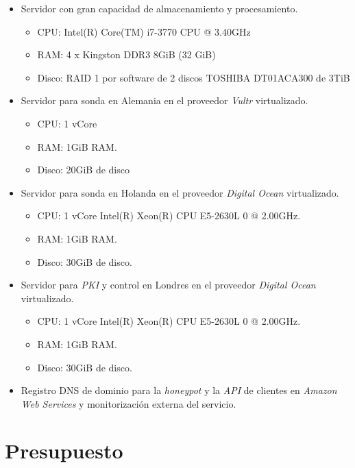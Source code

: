 \begin{itemize}
    \item Servidor con gran capacidad de almacenamiento y procesamiento.
    \begin{itemize}
        \item CPU: Intel(R) Core(TM) i7-3770 CPU @ 3.40GHz
        \item RAM: 4 x Kingston DDR3 8GiB (32 GiB)
        \item Disco: RAID 1 por software de 2 discos TOSHIBA DT01ACA300 de 3TiB
    \end{itemize}

    \item Servidor para sonda en Alemania en el proveedor \emph{Vultr} virtualizado.
    \begin{itemize}
        \item CPU: 1 vCore
        \item RAM: 1GiB RAM.
        \item Disco: 20GiB de disco
    \end{itemize}

    \item Servidor para sonda en Holanda en el proveedor \emph{Digital Ocean} virtualizado.
    \begin{itemize}
        \item CPU: 1 vCore Intel(R) Xeon(R) CPU E5-2630L 0 @ 2.00GHz.
        \item RAM: 1GiB RAM.
        \item Disco: 30GiB de disco.
    \end{itemize}

    \item Servidor para \emph{PKI} y control en Londres en el proveedor \emph{Digital Ocean} virtualizado.
    \begin{itemize}
        \item CPU: 1 vCore Intel(R) Xeon(R) CPU E5-2630L 0 @ 2.00GHz.
        \item RAM: 1GiB RAM.
        \item Disco: 30GiB de disco.
    \end{itemize}

    \item Registro DNS de dominio para la \emph{honeypot} y la \emph{API} de clientes en \emph{Amazon Web Services} y monitorización
    externa del servicio.

\end{itemize}


\section{Presupuesto}

